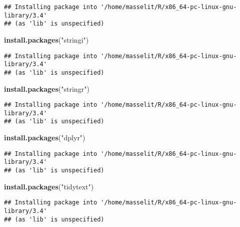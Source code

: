 \documentclass[]{article}
\newenvironment{Shaded}{\begin{snugshade}}{\end{snugshade}}
\newcommand{\KeywordTok}[1]{\textcolor[rgb]{0.13,0.29,0.53}{\textbf{#1}}}
\newcommand{\StringTok}[1]{\textcolor[rgb]{0.31,0.60,0.02}{#1}}
\newcommand{\NormalTok}[1]{#1}
\begin{document}
\begin{verbatim}
## Installing package into '/home/masselit/R/x86_64-pc-linux-gnu-library/3.4'
## (as 'lib' is unspecified)
\end{verbatim}

\begin{Shaded}
\begin{Highlighting}[]
\KeywordTok{install.packages}\NormalTok{(}\StringTok{"stringi"}\NormalTok{)}
\end{Highlighting}
\end{Shaded}

\begin{verbatim}
## Installing package into '/home/masselit/R/x86_64-pc-linux-gnu-library/3.4'
## (as 'lib' is unspecified)
\end{verbatim}

\begin{Shaded}
\begin{Highlighting}[]
\KeywordTok{install.packages}\NormalTok{(}\StringTok{"stringr"}\NormalTok{)}
\end{Highlighting}
\end{Shaded}

\begin{verbatim}
## Installing package into '/home/masselit/R/x86_64-pc-linux-gnu-library/3.4'
## (as 'lib' is unspecified)
\end{verbatim}

\begin{Shaded}
\begin{Highlighting}[]
\KeywordTok{install.packages}\NormalTok{(}\StringTok{"dplyr"}\NormalTok{)}
\end{Highlighting}
\end{Shaded}

\begin{verbatim}
## Installing package into '/home/masselit/R/x86_64-pc-linux-gnu-library/3.4'
## (as 'lib' is unspecified)
\end{verbatim}

\begin{Shaded}
\begin{Highlighting}[]
\KeywordTok{install.packages}\NormalTok{(}\StringTok{"tidytext"}\NormalTok{)}
\end{Highlighting}
\end{Shaded}

\begin{verbatim}
## Installing package into '/home/masselit/R/x86_64-pc-linux-gnu-library/3.4'
## (as 'lib' is unspecified)
\end{verbatim}
\end{document}
